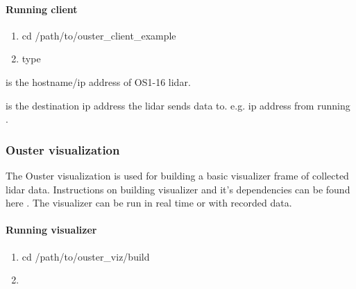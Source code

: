 \documentclass[letterpaper,10pt,english]{sphinxmanual}
\begin{document}
\paragraph{Running client}
\label{\detokenize{Ouster lidar:running-client}}\begin{enumerate}
\def\theenumi{\arabic{enumi}}
\def\labelenumi{\theenumi .}
\makeatletter\def\p@enumii{\p@enumi \theenumi .}\makeatother
\item {} 
cd /path/to/ouster\_client\_example

\item {} 
type 

\end{enumerate}

 is the hostname/ip address of OS1-16 lidar.

 is the destination ip address the lidar sends data to. e.g. ip address from running .


\subsubsection{Ouster visualization}
\label{\detokenize{Ouster lidar:ouster-visualization}}
The Ouster visualization is used for building a basic visualizer frame of collected lidar data. Instructions on building visualizer and it’s dependencies can be found here .
The visualizer can be run in real time or with recorded data.


\paragraph{Running visualizer}
\label{\detokenize{Ouster lidar:running-visualizer}}\begin{enumerate}
\def\theenumi{\arabic{enumi}}
\def\labelenumi{\theenumi .}
\makeatletter\def\p@enumii{\p@enumi \theenumi .}\makeatother
\item {} 
cd /path/to/ouster\_viz/build

\item {} 

\end{enumerate}
\end{document}

